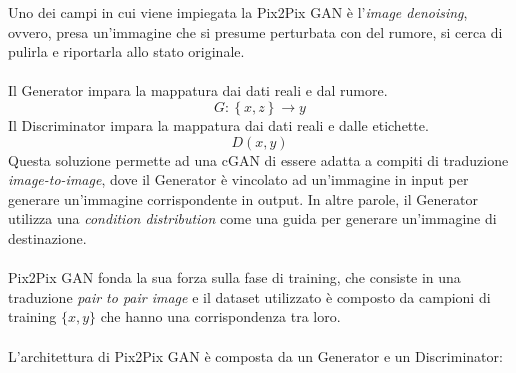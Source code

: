         Uno dei campi in cui viene impiegata la Pix2Pix GAN è l'\textit{image denoising}, ovvero, presa un'immagine che si presume perturbata con del rumore, si cerca di pulirla e riportarla allo stato originale.\\\\
        Il Generator impara la mappatura dai dati reali e dal rumore.
            \begin{equation*}
                G:\left \{ x, z \right \} \rightarrow y
            \end{equation*}
        Il Discriminator impara la mappatura dai dati reali e dalle etichette.
            \begin{equation*}
                D(x, y)
            \end{equation*}
        Questa soluzione permette ad una cGAN di essere adatta a compiti di traduzione \textit{image-to-image}, dove il Generator è vincolato ad un'immagine in input per generare un'immagine corrispondente in output. In altre parole, il Generator utilizza una \textit{condition distribution} come una guida per generare un'immagine di destinazione. \\\\
        Pix2Pix GAN fonda la sua forza sulla fase di training, che consiste in una traduzione \textit{pair to pair image} e il dataset utilizzato è composto da campioni di training $\{x, y\}$ che hanno una corrispondenza tra loro. \\\\
        L'architettura di Pix2Pix GAN è composta da un Generator e un Discriminator:
